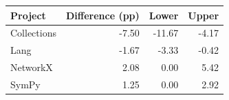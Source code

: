 \begin{tabular}{lrrr}
\toprule
Project & Difference (pp) & Lower & Upper \\
\midrule
Collections & -7.50 & -11.67 & -4.17 \\
Lang & -1.67 & -3.33 & -0.42 \\
NetworkX & 2.08 & 0.00 & 5.42 \\
SymPy & 1.25 & 0.00 & 2.92 \\
\bottomrule
\end{tabular}
